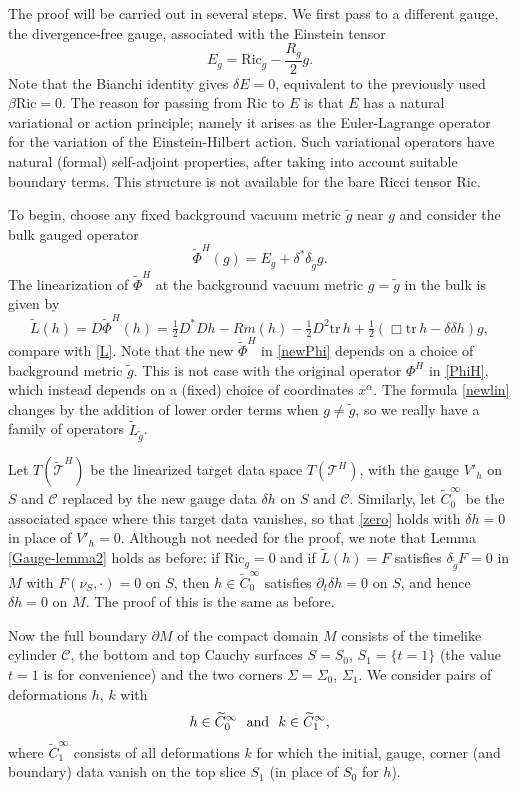 \documentclass[10pt]{amsart}
\renewcommand{\a}{\alpha}
\renewcommand{\b}{\beta}
\renewcommand{\d}{\delta}
\newcommand{\Si}{\Sigma}
\newcommand{\cC}{{\mathcal C}}
\newcommand{\cT}{{\mathcal T}}
\newcommand{\Ric}{\mathrm{Ric}}
\newcommand{\be}{\begin{equation}}
\newcommand{\ee}{\end{equation}}
\newcommand{\tr}{\mathrm{tr}}
\newcommand{\p}{\partial}
\newcommand{\<}{\langle}
\renewcommand{\>}{\rangle}
\newcommand{\dm}{{\partial M}}
\newcommand{\w}{\widetilde}
\theoremstyle{plain}
\theoremstyle{remark}
\theoremstyle{definition}
\numberwithin{equation}{section}
\begin{document}
  The proof will be carried out in several steps.  We first pass to a different gauge, the divergence-free gauge, associated with the Einstein tensor 
$$E_g = \Ric_g - \frac{R_g}{2}g.$$ 
Note that the Bianchi identity gives $\d E = 0$, equivalent to the previously used $\b \Ric = 0$. The reason for passing from $\Ric$ to $E$ is that 
$E$ has a natural variational or action principle; namely it arises as the Euler-Lagrange operator for the variation of the Einstein-Hilbert action. 
Such variational operators have natural (formal) self-adjoint properties, after taking into account suitable boundary terms. This structure is not 
available for the bare Ricci tensor $\Ric$. 

   To begin, choose any fixed background vacuum metric $\w g$ near $g$ and consider the bulk gauged operator 
\be \label{newPhi}
\w \Phi^H(g) = E_g + \d^* \d_{\w g} g.
\ee
The linearization of $\w \Phi^H$ at the background vacuum metric $g = \w g$ in the bulk is given by  
\be \label{newlin}
\w L(h) = D \w \Phi^H(h) = \tfrac{1}{2}D^*Dh - Rm(h)  - \tfrac{1}{2}D^2 \tr \, h + \tfrac{1}{2}(\Box \tr \, h- \d \d h)  g,
\ee
compare with \eqref{L}. Note that the new $\w \Phi^H$ in \eqref{newPhi} depends on a choice of background metric $\w g$. This is not case with 
the original operator $\Phi^H$ in \eqref{PhiH}, which instead depends on a (fixed) choice of coordinates $x^{\a}$. The formula \eqref{newlin} changes by 
the addition of lower order terms when $g \neq \w g$, so we really have a family of operators $\w L_{\w g}$. 

  Let $T(\w \cT^H)$ be the linearized target data space $T(\cT^H)$, with the gauge $V'_h$ on $S$ and $\cC$ replaced  by the new gauge data $\d h$ on $S$ 
and $\cC$. Similarly, let $\w C^{\infty}_0$ be the associated space where this target data vanishes, so that \eqref{zero} holds with $\d h = 0$ 
in place of $V'_h = 0$. Although not needed for the proof, we note that Lemma \ref{Gauge-lemma2} holds as before: if $\Ric_g = 0$ and if 
$\w L(h)=F$ satisfies $\d_{\w g}F=0$ in $M$ with $F(\nu_S, \cdot) = 0$ on $S$, then $h\in \w C_0^\infty$ satisfies $\p_t \d h = 0$ on $S$, 
and hence $\d h = 0$ on $M$. The proof of this is the same as before. 

  Now the full boundary $\dm$ of the compact domain $M$ consists of the timelike cylinder $\cC$, the bottom and top Cauchy surfaces $S = S_0$, 
$S_1 = \{t = 1\}$ (the value $t = 1$ is for convenience) and the two corners $\Si = \Si_0$, $\Si_1$. We consider pairs of deformations $h$, $k$ with 
\be \label{01}
h \in \w C^{\infty}_0 \ \ {\rm and} \ \  k \in \w C^{\infty}_1,
\ee
where $\w C^{\infty}_1$ consists of all deformations $k$ for which the initial, gauge, corner (and boundary) data vanish on the top slice $S_1$ 
(in place of $S_0$ for $h$). 
\end{document}
